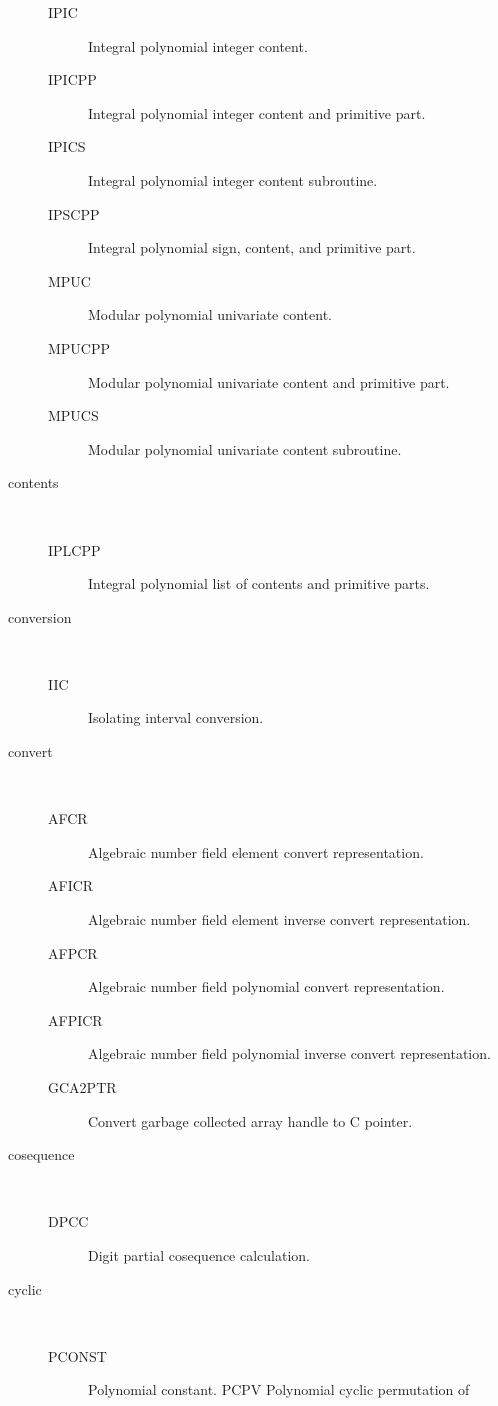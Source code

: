 \begin{description}
\begin{description}
  \item[IPIC]  Integral polynomial integer content.
  \item[IPICPP]  Integral polynomial integer content and primitive part.
  \item[IPICS]  Integral polynomial integer content subroutine.
  \item[IPSCPP]  Integral polynomial sign, content, and primitive part.
  \item[MPUC]  Modular polynomial univariate content.
  \item[MPUCPP]  Modular polynomial univariate content and primitive part.
  \item[MPUCS]  Modular polynomial univariate content subroutine.
  \end{description}
\item[contents] \ \ 
  \begin{description}
  \item[IPLCPP]  Integral polynomial list of contents and primitive parts.
  \end{description}
\item[conversion] \ \ 
  \begin{description}
  \item[IIC]  Isolating interval conversion.
  \end{description}
\item[convert] \ \ 
  \begin{description}
  \item[AFCR]  Algebraic number field element convert representation.
  \item[AFICR]  Algebraic number field element inverse convert representation.
  \item[AFPCR]  Algebraic number field polynomial convert representation.
  \item[AFPICR]  Algebraic number field polynomial inverse convert
    representation.
  \item[GCA2PTR]  Convert garbage collected array handle to C pointer.
  \end{description}
\item[cosequence] \ \ 
  \begin{description}
  \item[DPCC]  Digit partial cosequence calculation.
  \end{description}
\item[cyclic] \ \ 
  \begin{description}
  \item[PCONST]  Polynomial constant. PCPV Polynomial cyclic permutation of

\end{description}
\end{description}

